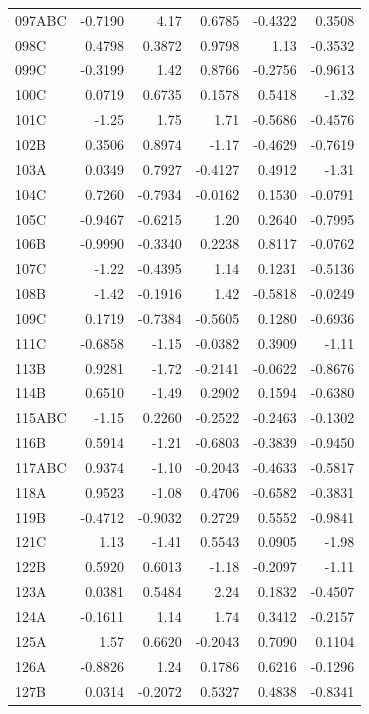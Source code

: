 \begin{longtable}{lrrrrr}
  097ABC & -0.7190 & 4.17 & 0.6785 & -0.4322 & 0.3508 \\
  098C & 0.4798 & 0.3872 & 0.9798 & 1.13 & -0.3532 \\
  099C & -0.3199 & 1.42 & 0.8766 & -0.2756 & -0.9613 \\
  100C & 0.0719 & 0.6735 & 0.1578 & 0.5418 & -1.32 \\
  101C & -1.25 & 1.75 & 1.71 & -0.5686 & -0.4576 \\
  102B & 0.3506 & 0.8974 & -1.17 & -0.4629 & -0.7619 \\
  103A & 0.0349 & 0.7927 & -0.4127 & 0.4912 & -1.31 \\
  104C & 0.7260 & -0.7934 & -0.0162 & 0.1530 & -0.0791 \\
  105C & -0.9467 & -0.6215 & 1.20 & 0.2640 & -0.7995 \\
  106B & -0.9990 & -0.3340 & 0.2238 & 0.8117 & -0.0762 \\
  107C & -1.22 & -0.4395 & 1.14 & 0.1231 & -0.5136 \\
  108B & -1.42 & -0.1916 & 1.42 & -0.5818 & -0.0249 \\
  109C & 0.1719 & -0.7384 & -0.5605 & 0.1280 & -0.6936 \\
  111C  & -0.6858 & -1.15 & -0.0382 & 0.3909 & -1.11 \\
  113B & 0.9281 & -1.72 & -0.2141 & -0.0622 & -0.8676 \\
  114B & 0.6510 & -1.49 & 0.2902 & 0.1594 & -0.6380 \\
  115ABC & -1.15 & 0.2260 & -0.2522 & -0.2463 & -0.1302 \\
  116B & 0.5914 & -1.21 & -0.6803 & -0.3839 & -0.9450 \\
  117ABC & 0.9374 & -1.10 & -0.2043 & -0.4633 & -0.5817 \\
  118A & 0.9523 & -1.08 & 0.4706 & -0.6582 & -0.3831 \\
  119B & -0.4712 & -0.9032 & 0.2729 & 0.5552 & -0.9841 \\
  121C & 1.13 & -1.41 & 0.5543 & 0.0905 & -1.98 \\
  122B & 0.5920 & 0.6013 & -1.18 & -0.2097 & -1.11 \\
  123A & 0.0381 & 0.5484 & 2.24 & 0.1832 & -0.4507 \\
  124A & -0.1611 & 1.14 & 1.74 & 0.3412 & -0.2157 \\
  125A & 1.57 & 0.6620 & -0.2043 & 0.7090 & 0.1104 \\
  126A & -0.8826 & 1.24 & 0.1786 & 0.6216 & -0.1296 \\
  127B & 0.0314 & -0.2072 & 0.5327 & 0.4838 & -0.8341 \\

\end{longtable}
